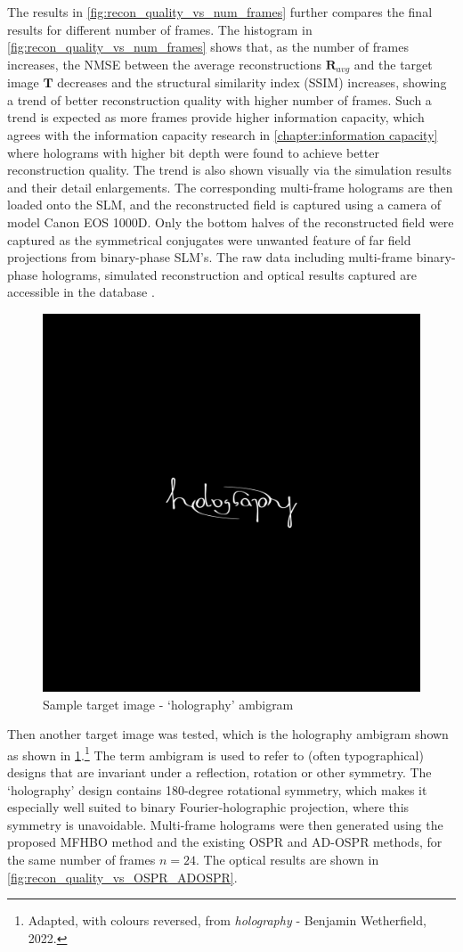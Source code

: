 	The results in \cref{fig:recon_quality_vs_num_frames} further compares the final results for different number of frames. The histogram in \cref{fig:recon_quality_vs_num_frames} shows that, as the number of frames increases, the NMSE between the average reconstructions $\textbf{R}_{avg}$ and the target image $\textbf{T}$ decreases and the structural similarity index (SSIM)\cite{Wang2004_SSIM} increases, showing a trend of better reconstruction quality with higher number of frames. Such a trend is expected as more frames provide higher information capacity, which agrees with the information capacity research in \cref{chapter:information capacity} where holograms with higher bit depth were found to achieve better reconstruction quality. The trend is also shown visually via the simulation results and their detail enlargements. The corresponding multi-frame holograms are then loaded onto the SLM, and the reconstructed field is captured using a camera of model Canon EOS 1000D. Only the bottom halves of the reconstructed field were captured as the symmetrical conjugates were unwanted feature of far field projections from binary-phase SLM's. The raw data including multi-frame binary-phase holograms, simulated reconstruction and optical results captured are accessible in the database \cite{research_data_MFHO2024}.

	\begin{figure}[H]
		\centering
		\includegraphics[width=0.5\linewidth]{holography_ambigram_smaller.png}
		\caption{Sample target image - `holography' ambigram}
		\label{fig:holography_ambigram_smaller}
	\end{figure}

	Then another target image was tested, which is the holography ambigram shown  as shown in \cref{fig:holography_ambigram_smaller}.\footnote{Adapted, with colours reversed, from  \emph{holography} - Benjamin Wetherfield, 2022.} The term ambigram is used to refer to (often typographical) designs that are invariant under a reflection, rotation or other symmetry. The `holography' design contains 180-degree rotational symmetry, which makes it especially well suited to binary Fourier-holographic projection, where this symmetry is unavoidable. Multi-frame holograms were then generated using the proposed MFHBO method and the existing OSPR and AD-OSPR methods, for the same number of frames $n=24$. The optical results are shown in \cref{fig:recon_quality_vs_OSPR_ADOSPR}.

